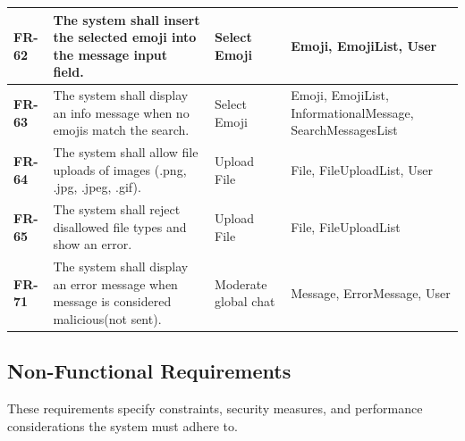 \begin{longtable}{|p{3cm}|p{5.5cm}|l|p{4cm}|}
\hline
\textbf{FR-62} & The system shall insert the selected emoji into the message input field. & Select Emoji & Emoji, EmojiList, User \\
\hline
\textbf{FR-63} & The system shall display an info message when no emojis match the search. & Select Emoji & Emoji, EmojiList, InformationalMessage, SearchMessagesList \\
\hline
\textbf{FR-64} & The system shall allow file uploads of images (.png, .jpg, .jpeg, .gif). & Upload File & File, FileUploadList, User \\
\hline
\textbf{FR-65} & The system shall reject disallowed file types and show an error. & Upload File & File, FileUploadList \\
\hline
\textbf{FR-71} & The system shall display an error message when message is considered malicious(not sent). & Moderate global chat & Message, ErrorMessage, User \\
\end{longtable}

\subsection{Non-Functional Requirements}

These requirements specify constraints, security measures, and performance
considerations the system must adhere to.


